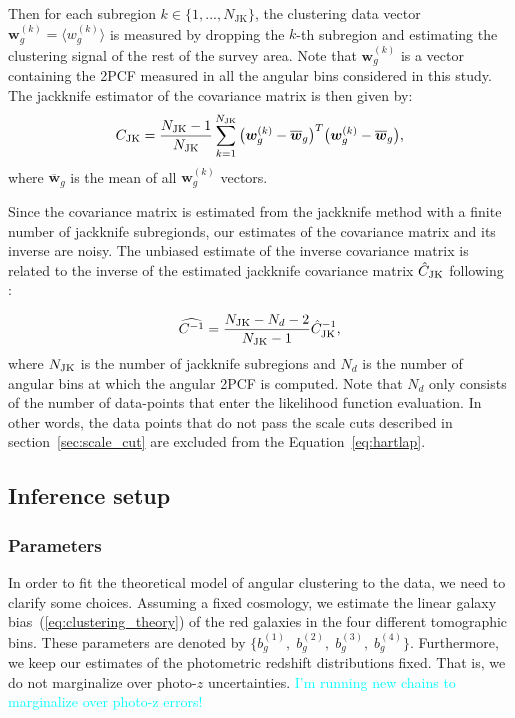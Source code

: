 \documentclass[fleqn,usenatbib,useAMS]{mnras}
\newcommand{\mjv}{\textcolor{cyan}}
\newcommand{\be}{\begin{equation}}
\newcommand{\ee}{\end{equation}}
\newcommand{\dk}{\boldsymbol{w}_{g}^{(k)}}
\newcommand{\dbar}{\overline{\boldsymbol{w}}_{g}}
\newcommand{\njk}{N_{\rm JK}}
\begin{document}
Then for each subregion $k\in\{1,...,N_{\mathrm{JK}}\}$, the clustering data vector $\boldsymbol{w}_{g}^{(k)} = \langle w^{(k)}_{g}\rangle$ is measured by dropping the $k$-th subregion and estimating the clustering signal of the rest of the survey area. Note that $\boldsymbol{w}_{g}^{(k)}$ is a vector containing the 2PCF measured in all the angular bins considered in this study. The jackknife estimator of the covariance matrix is then given by:
\be 
C_{\rm JK} = \frac{\njk - 1}{\njk}\sum_{k=1}^{\njk}\big(\dk-\dbar\big)^{T}\big(\dk-\dbar\big), 
\label{eq:jk}
\ee
where $\dbar$ is the mean of all $\boldsymbol{w}_{g}^{(k)}$ vectors. 

Since the covariance matrix is estimated from the jackknife method with a finite number of jackknife subregionds, our estimates of the covariance matrix and its inverse are noisy. The unbiased estimate of the inverse covariance matrix is related to the inverse of the estimated jackknife covariance matrix $\hat{C}_{\rm JK}$ following \citet{hartlap2007}:

\be
\widehat{C^{-1}} = \frac{\njk - N_{d} - 2}{\njk - 1} \hat{C}^{-1}_{\rm JK},
\label{eq:hartlap}
\ee
where $\njk$ is the number of jackknife subregions and $N_{d}$ is the number of angular bins at which the angular 2PCF is computed. Note that $N_d$ only consists of the number of data-points that enter the likelihood function evaluation. In other words, the data points that do not pass the scale cuts described in section~\ref{sec:scale_cut} are excluded from the Equation~\ref{eq:hartlap}.  

\subsection{Inference setup}

\subsubsection{Parameters}

In order to fit the theoretical model of angular clustering to the data, we need to clarify some choices. Assuming a fixed cosmology, we estimate the linear galaxy bias~(\ref{eq:clustering_theory}) of the red galaxies in the four different tomographic bins. These parameters are denoted by $\{b^{(1)}_g, \; b^{(2)}_g, \; b^{(3)}_g, \; b^{(4)}_g\}$. Furthermore, we keep our estimates of the photometric redshift distributions fixed. That is, we do not marginalize over photo-$z$ uncertainties. 
\mjv{I'm running new chains to marginalize over photo-z errors!}
\end{document}
